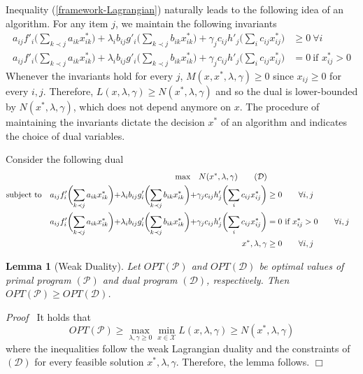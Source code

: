 \documentclass[11pt]{article}
\newenvironment{proof}{\noindent\emph{Proof\ }}{\hspace*{\fill}$\Box$\medskip}
\newtheorem{lemma}{Lemma}
\begin{document}
Inequality (\ref{framework-Lagrangian}) naturally leads to the following idea of an algorithm. 
For any item $j$, we maintain the following invariants  
\begin{align*}
a_{ij}f'_{i}\biggl( \sum_{k \prec j} a_{ik}x^{*}_{ik} \biggl) 
	+ \lambda_{i} b_{ij}g'_{i}\biggl(\sum_{k \prec j} b_{ik} x^{*}_{ik}\biggl)  
	+ \gamma_{j}c_{ij} h'_{j}\biggl(\sum_{i} c_{ij} x^{*}_{ij}\biggl)
	&\geq 0 ~\forall i \\
a_{ij}f'_{i}\biggl( \sum_{k \prec j} a_{ik}x^{*}_{ik} \biggl) 
	+ \lambda_{i} b_{ij}g'_{i}\biggl(\sum_{k \prec j} b_{ik} x^{*}_{ik}\biggl)  
	+ \gamma_{j}c_{ij} h'_{j}\biggl(\sum_{i} c_{ij} x^{*}_{ij}\biggl)
	&= 0 ~\text{if } x^{*}_{ij} > 0 
\end{align*}
Whenever the invariants hold for every $j$,
$M(x,x^{*},\lambda,\gamma) \geq 0$ since $x_{ij} \geq 0$ for every $i,j$. 
Therefore, $L(x,\lambda,\gamma) \geq N(x^{*},\lambda,\gamma)$ and so the dual 
is lower-bounded by $N(x^{*},\lambda,\gamma)$, which does not depend anymore
on $x$. The procedure of maintaining the invariants dictate the decision $x^{*}$ 
of an algorithm and indicates the choice of dual variables. 

Consider the following dual
\begin{alignat}{3}	\label{prog:dual}
    \text{max} \quad  N(x^{*},\lambda,\gamma)  \tag{$\mathcal{D}$} \\
\text{subject to} \quad   a_{ij}f'_{i}\biggl( \sum_{k \prec j} a_{ik}x^{*}_{ik} \biggl) 
	+ \lambda_{i} b_{ij}g'_{i}\biggl(\sum_{k \prec j} b_{ik} x^{*}_{ik}\biggl)  
	+ \gamma_{j}c_{ij} h'_{j}\biggl(\sum_{i} c_{ij} x^{*}_{ij}\biggl)
		&\geq 0 \qquad \forall i,j 	\notag \\
a_{ij}f'_{i}\biggl( \sum_{k \prec j} a_{ik}x^{*}_{ik} \biggl) 
	+ \lambda_{i} b_{ij}g'_{i}\biggl(\sum_{k \prec j} b_{ik} x^{*}_{ik}\biggl)  
	+ \gamma_{j}c_{ij} h'_{j}\biggl(\sum_{i} c_{ij} x^{*}_{ij}\biggl) 
	&= 0 ~\text{if } x^{*}_{ij} > 0 \qquad \forall i,j 	\notag \\ 
x^{*},\lambda,\gamma &\geq 0 \qquad \forall i,j	\notag
  \end{alignat}

\begin{lemma}[Weak Duality]
Let $OPT(\mathcal{P})$ and $OPT(\mathcal{D})$ be optimal values of primal program
$(\mathcal{P})$ and dual program $(\mathcal{D})$, respectively. Then
$OPT(\mathcal{P}) \geq OPT(\mathcal{D})$.
\end{lemma}
\begin{proof}
It holds that
$$
OPT(\mathcal{P}) \geq \max_{\lambda,\gamma \geq 0} \min_{x \in \mathcal{X}} L(x,\lambda,\gamma)
\geq N(x^{*},\lambda,\gamma)
$$
where the inequalities follow the weak Lagrangian duality and the constraints of $(\mathcal{D})$
for every feasible solution $x^{*},\lambda,\gamma$.
Therefore, the lemma follows.
\end{proof}
\end{document}
